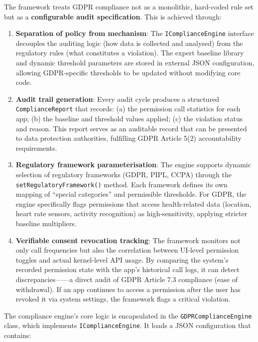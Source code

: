 The framework treats GDPR compliance not as a monolithic, hard-coded rule set but as a \textbf{configurable audit specification}. This is achieved through:

\begin{enumerate}
\item \textbf{Separation of policy from mechanism}: The \texttt{IComplianceEngine} interface decouples the auditing logic (how data is collected and analysed) from the regulatory rules (what constitutes a violation). The expert baseline library and dynamic threshold parameters are stored in external JSON configuration, allowing GDPR-specific thresholds to be updated without modifying core code.
\item \textbf{Audit trail generation}: Every audit cycle produces a structured \texttt{ComplianceReport} that records: (a) the permission call statistics for each app; (b) the baseline and threshold values applied; (c) the violation status and reason. This report serves as an auditable record that can be presented to data protection authorities, fulfilling GDPR Article 5(2) accountability requirements.
\item \textbf{Regulatory framework parameterisation}: The engine supports dynamic selection of regulatory frameworks (GDPR, PIPL, CCPA) through the \texttt{setRegulatoryFramework()} method. Each framework defines its own mapping of ``special categories'' and permissible thresholds. For GDPR, the engine specifically flags permissions that access health-related data (location, heart rate sensors, activity recognition) as high-sensitivity, applying stricter baseline multipliers.
\item \textbf{Verifiable consent revocation tracking}: The framework monitors not only call frequencies but also the correlation between UI-level permission toggles and actual kernel-level API usage. By comparing the system's recorded permission state with the app's historical call logs, it can detect discrepancies——a direct audit of GDPR Article 7.3 compliance (ease of withdrawal). If an app continues to access a permission after the user has revoked it via system settings, the framework flags a critical violation.
\end{enumerate}

The compliance engine's core logic is encapsulated in the \texttt{GDPRComplianceEngine} class, which implements \texttt{IComplianceEngine}. It loads a JSON configuration that contains:

